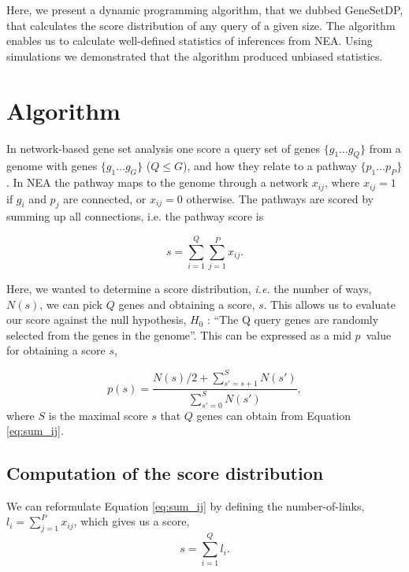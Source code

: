 \documentclass[a4paper,american]{lipics-v2016}
\begin{document}
Here, we present a dynamic programming algorithm, that we dubbed GeneSetDP, that calculates the score distribution of any query of a given size. The algorithm enables us to calculate well-defined statistics of inferences from NEA.  Using simulations we demonstrated that the algorithm produced unbiased statistics.

\section*{Algorithm}

In network-based gene set analysis one score a query set of genes $ \{g_1 \ldots g_Q\} $ from a genome with genes $\{g_1 \ldots g_G\}$ ($Q \le G$), and how they relate to a pathway $\{p_1 \ldots p_P\}$. In NEA the pathway maps to the genome through a network ${x_{ij}}$, where $x_{ij}=1$ if $g_i$ and $p_j$ are connected, or $x_{ij}=0$ otherwise. The pathways are scored by summing up all connections, i.e. the pathway score is

\begin{equation}
s=\sum_{i=1}^Q\sum_{j=1}^P x_{ij}.
\label{eq:sum_ij}
\end{equation}

Here, we wanted to determine a score distribution, {\em i.e.} the number of ways, $N(s)$, we can pick $Q$ genes and obtaining a score, $s$. This allows us to evaluate our score against the null hypothesis, $H_0$ : ``The Q query genes are randomly selected from the genes in the genome''. This can be expressed as a mid $p$~value\cite{lancaster1961significance,hwang2001optimality} for obtaining a score $s$,

\begin{equation}
p(s)=\frac{N(s)/2 +\sum_{s'=s+1}^{S} N(s')}{\sum_{s'=0}^{S} N(s')},
\label{eq:pval}
\end{equation}
where $S$ is the maximal score $s$ that $Q$ genes can obtain from Equation \ref{eq:sum_ij}.

\subsection*{Computation of the score distribution}

We can reformulate Equation \ref{eq:sum_ij} by defining the number-of-links, $l_i=\sum_{j=1}^P x_{ij}$, which gives us a score,
\begin{equation}
s=\sum_{i=1}^Q l_i.
\label{eq:sum_i}
\end{equation}
\end{document}
